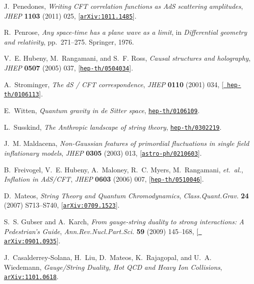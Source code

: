 \documentclass[12pt,a4paper]{article}
\begin{document}
\begin{thebibliography}{100}
J.~Penedones, {\it {Writing CFT correlation functions as AdS scattering
  amplitudes}},  {\em JHEP} {\bf 1103} (2011) 025,
  [\href{http://xxx.lanl.gov/abs/1011.1485}{{\tt arXiv:1011.1485}}].

R.~Penrose, {\it Any space-time has a plane wave as a limit},  in {\em
  Differential geometry and relativity}, pp.~271--275.
\newblock Springer, 1976.

V.~E. Hubeny, M.~Rangamani, and S.~F. Ross, {\it {Causal structures and
  holography}},  {\em JHEP} {\bf 0507} (2005) 037,
  [\href{http://xxx.lanl.gov/abs/hep-th/0504034}{{\tt hep-th/0504034}}].

A.~Strominger, {\it {The dS / CFT correspondence}},  {\em JHEP} {\bf 0110}
  (2001) 034, [\href{http://xxx.lanl.gov/abs/hep-th/0106113}{{\tt
  hep-th/0106113}}].

E.~Witten, {\it {Quantum gravity in de Sitter space}},
  \href{http://xxx.lanl.gov/abs/hep-th/0106109}{{\tt hep-th/0106109}}.

L.~Susskind, {\it {The Anthropic landscape of string theory}},
  \href{http://xxx.lanl.gov/abs/hep-th/0302219}{{\tt hep-th/0302219}}.

J.~M. Maldacena, {\it {Non-Gaussian features of primordial fluctuations in
  single field inflationary models}},  {\em JHEP} {\bf 0305} (2003) 013,
  [\href{http://xxx.lanl.gov/abs/astro-ph/0210603}{{\tt astro-ph/0210603}}].

B.~Freivogel, V.~E. Hubeny, A.~Maloney, R.~C. Myers, M.~Rangamani, {\em
  et.~al.}, {\it {Inflation in AdS/CFT}},  {\em JHEP} {\bf 0603} (2006) 007,
  [\href{http://xxx.lanl.gov/abs/hep-th/0510046}{{\tt hep-th/0510046}}].

D.~Mateos, {\it {String Theory and Quantum Chromodynamics}},  {\em
  Class.Quant.Grav.} {\bf 24} (2007) S713--S740,
  [\href{http://xxx.lanl.gov/abs/0709.1523}{{\tt arXiv:0709.1523}}].

S.~S. Gubser and A.~Karch, {\it {From gauge-string duality to strong
  interactions: A Pedestrian's Guide}},  {\em Ann.Rev.Nucl.Part.Sci.} {\bf 59}
  (2009) 145--168, [\href{http://xxx.lanl.gov/abs/0901.0935}{{\tt
  arXiv:0901.0935}}].

J.~Casalderrey-Solana, H.~Liu, D.~Mateos, K.~Rajagopal, and U.~A. Wiedemann,
  {\it {Gauge/String Duality, Hot QCD and Heavy Ion Collisions}},
  \href{http://xxx.lanl.gov/abs/1101.0618}{{\tt arXiv:1101.0618}}.


\end{thebibliography}
\end{document}
